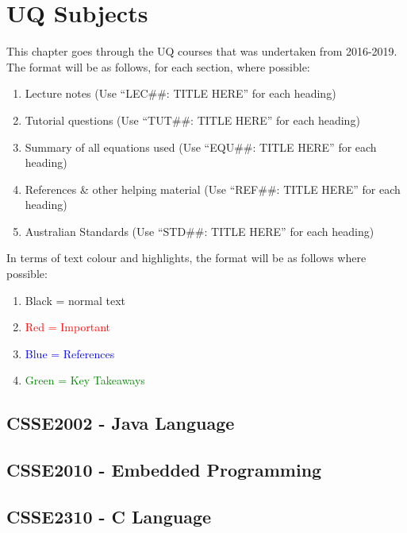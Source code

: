 \pagestyle{fancy}
\fancyfoot[R]{\thepage}
\renewcommand{\headrulewidth}{0.4pt}
\renewcommand{\footrulewidth}{2pt}

\section{UQ Subjects} %
This chapter goes through the UQ courses that was undertaken from 2016-2019. The format will be as follows, for each section, where possible:
\begin{enumerate}
  \item Lecture notes (Use ``LEC\#\#: TITLE HERE'' for each heading)
  \item Tutorial questions (Use ``TUT\#\#: TITLE HERE'' for each heading)
  \item Summary of all equations used (Use ``EQU\#\#: TITLE HERE'' for each heading)
  \item References \& other helping material (Use ``REF\#\#: TITLE HERE'' for each heading)
  \item Australian Standards (Use ``STD\#\#: TITLE HERE'' for each heading)
\end{enumerate}

In terms of text colour and highlights, the format will be as follows where possible:
\begin{enumerate}
  \item Black = normal text
  \item \textcolor{red}{Red = Important}
  \item \textcolor{blue}{Blue = References}
  \item \textcolor{green}{Green = Key Takeaways}
\end{enumerate}

\subsection{CSSE2002 - Java Language}
\clearpage

\subsection{CSSE2010 - Embedded Programming}
\clearpage

\subsection{CSSE2310 - C Language}
\clearpage

